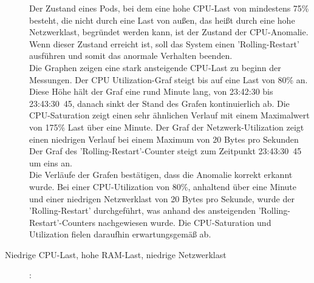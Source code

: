 \documentclass[a4paper,10pt]{scrartcl}
\begin{document}
\begin{description}
Der Zustand eines Pods, bei dem eine hohe CPU-Last von mindestens 75\% besteht, die nicht durch eine Last von außen, das heißt durch eine hohe Netzwerklast, begründet werden kann, ist der Zustand der CPU-Anomalie. Wenn dieser Zustand erreicht ist, soll das System einen 'Rolling-Restart' ausführen und somit das anormale Verhalten beenden.\\
Die Graphen zeigen eine stark ansteigende CPU-Last zu beginn der Messungen. Der CPU Utilization-Graf steigt bis auf eine Last von 80\% an. Diese Höhe hält der Graf eine rund Minute lang, von 23:42:30 bis 23:43:30~45, danach sinkt der Stand des Grafen kontinuierlich ab. Die CPU-Saturation zeigt einen sehr ähnlichen Verlauf mit einem Maximalwert von 175\% Last über eine Minute. Der Graf der Netzwerk-Utilization zeigt einen niedrigen Verlauf bei einem Maximum von 20 Bytes pro Sekunden\\
Der Graf des 'Rolling-Restart'-Counter steigt zum Zeitpunkt 23:43:30~45 um eins an.\\
Die Verläufe der Grafen bestätigen, dass die Anomalie korrekt erkannt wurde. Bei einer CPU-Utilization von 80\%, anhaltend über eine Minute und einer niedrigen Netzwerklast von 20 Bytes pro Sekunde, wurde der 'Rolling-Restart' durchgeführt, was anhand des ansteigenden 'Rolling-Restart'-Counters nachgewiesen wurde. Die CPU-Saturation und Utilization fielen daraufhin erwartungsgemäß ab.

\pagebreak

\item[Niedrige CPU-Last, hohe RAM-Last, niedrige Netzwerklast]:\\


\end{description}
\end{document}
